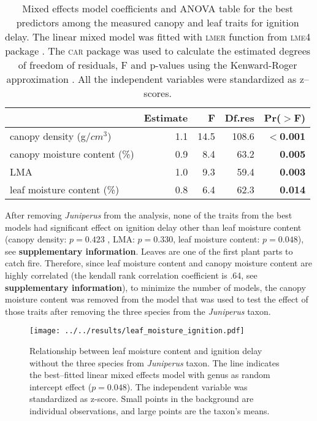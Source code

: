 \documentclass{bmcart}
\newcommand{\pkg}[1]{\textsc{#1}}
\begin{document}
\begin{table}[ht]
  \centering
  \caption{Mixed effects model coefficients and ANOVA table for the best
    predictors among the measured canopy and leaf traits for ignition delay.
    The linear mixed model was fitted with \pkg{lmer} function from \pkg{lme4}
    package \citep{bates2009package}. The \pkg{car} package
    \citep{fox2013hypothesis} was used to calculate the estimated degrees of
    freedom of residuals, F and p-values using the Kenward-Roger approximation
    \citep{kenward1997small}. All the independent variables were standardized
    as z--scores.}
  \begin{tabular}{lrrrr}
    \toprule
    & Estimate & F & Df.res & Pr($>$F) \\ 
    \midrule
    canopy density (g/{$cm^3$}) & 1.1 & 14.5  & 108.6 & \textbf{$<$0.001} \\ 
    canopy moisture content (\%) & 0.9 & 8.4 & 63.2 & \textbf{0.005} \\ 
    LMA & 1.0 & 9.3  & 59.4 & \textbf{0.003} \\  
    leaf moisture content (\%) & 0.8 & 6.4  & 62.3 & \textbf{0.014} \\ 
    \bottomrule
  \end{tabular}
  \label{tab:fandpforig_delay}
\end{table}
After removing \emph{Juniperus} from the analysis, none of the traits from the best models had significant effect on ignition delay other than leaf moisture content (canopy density: $p = 0.423$ , LMA: $p = 0.330$, leaf moisture content: $p = 0.048$), see \textbf{supplementary information}. Leaves are one of the first plant parts to catch fire. Therefore, since leaf moisture content and canopy moisture content are highly correlated (the kendall rank correlation coefficient is .64, see \textbf{supplementary information}), to minimize the number of models, the canopy moisture content was removed from the model that was used to test the effect of those traits after removing the three species from the \emph{Juniperus} taxon.

\begin{figure}[ht]
  \centering \texttt{[image: ../../results/leaf\_moisture\_ignition.pdf]}
  \caption[Leaf moisture content effect on ignition delay]{\label{fig:leafmc_ig_delay}Relationship between leaf moisture content and ignition delay without the three species from \emph{Juniperus} taxon. The line indicates the best--fitted linear mixed effects model with genus as random intercept effect ($p = 0.048$). The independent variable was standardized  as z-score. Small points in the background are individual observations, and large points are the taxon's means.} 
\end{figure}
\end{document}
